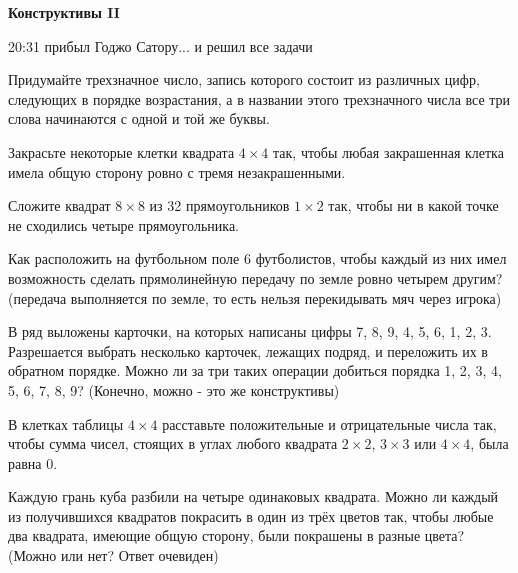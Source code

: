\centerline{\bf \Huge Конструктивы II}


\begin{flushright}
        \scriptsize{20:31 прибыл Годжо Сатору... и решил все задачи}
\end{flushright}

 Придумайте трехзначное число, запись которого состоит из различных цифр, следующих в порядке возрастания, а в названии этого трехзначного числа все три слова начинаются с одной и той же буквы.

 Закрасьте некоторые клетки квадрата $4\times4$ так, чтобы любая закрашенная клетка имела общую сторону ровно с тремя незакрашенными.

 Сложите квадрат $8\times8$ из 32 прямоугольников $1\times2$  так, чтобы ни в какой точке не сходились четыре прямоугольника.

 Как расположить на футбольном поле 6 футболистов, чтобы каждый из них имел возможность сделать прямолинейную передачу по земле ровно четырем другим? (передача выполняется по земле, то есть нельзя перекидывать мяч через игрока)

 В ряд выложены карточки, на которых написаны цифры 7, 8, 9, 4, 5, 6, 1, 2, 3. Разрешается выбрать несколько карточек, лежащих подряд, и переложить их в обратном порядке. Можно ли за три таких операции добиться порядка 1, 2, 3, 4, 5, 6, 7, 8, 9? (Конечно, можно - это же конструктивы)

 В клетках таблицы $4\times4$ расставьте положительные и отрицательные числа так, чтобы сумма чисел, стоящих в углах любого квадрата $2\times2$, $3\times3$ или $4\times4$, была равна 0.

 Каждую грань куба разбили на четыре одинаковых квадрата. Можно ли каждый из получившихся квадратов покрасить в один из трёх цветов так, чтобы любые два квадрата, имеющие общую сторону, были покрашены в разные цвета? (Можно или нет? Ответ очевиден)